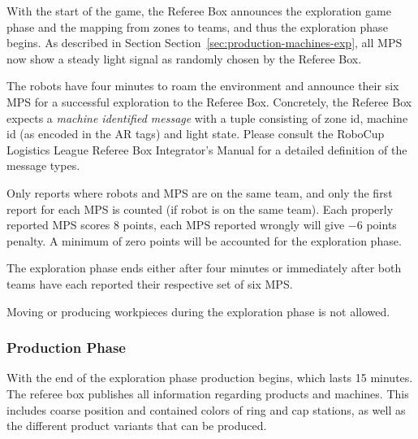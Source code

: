 \documentclass[12pt,twoside]{article}
\newcommand{\refsec}[1]{Section~\ref{#1}}
\begin{document}
With the start of the game, the Referee Box announces the exploration 
game phase and the mapping from zones to teams, and thus the exploration 
phase begins. As described in Section \refsec{sec:production-machines-exp}, 
all MPS now show a steady light signal as randomly chosen by the Referee Box. 

The robots have four minutes to roam the environment and announce their 
six MPS for a successful exploration to the Referee Box. Concretely, 
the Referee Box expects a \emph{machine identified message} with a 
tuple consisting of zone id, machine id (as encoded in the AR tags) 
and light state. Please consult the RoboCup Logistics League Referee 
Box Integrator's Manual for a detailed definition of the message types.

Only reports where robots and MPS are on the same team, and only the 
first report for each MPS is counted (if robot is on the same team). 
Each properly reported MPS scores \num{+8} points, each MPS reported 
wrongly will give \num{-6} points penalty. A minimum of zero points will 
be accounted for the exploration phase.

The exploration phase ends either after four minutes or immediately after 
both teams have each reported their respective set of six MPS.

Moving or producing workpieces during the exploration phase is not allowed.

\subsubsection{Production Phase}
\label{sec:production-phase}
With the end of the exploration phase production begins, which lasts
\num{15} minutes. The referee box publishes all information regarding
products and machines. This includes coarse position and contained
colors of ring and cap stations, as well as the different product
variants that can be produced.
\end{document}
